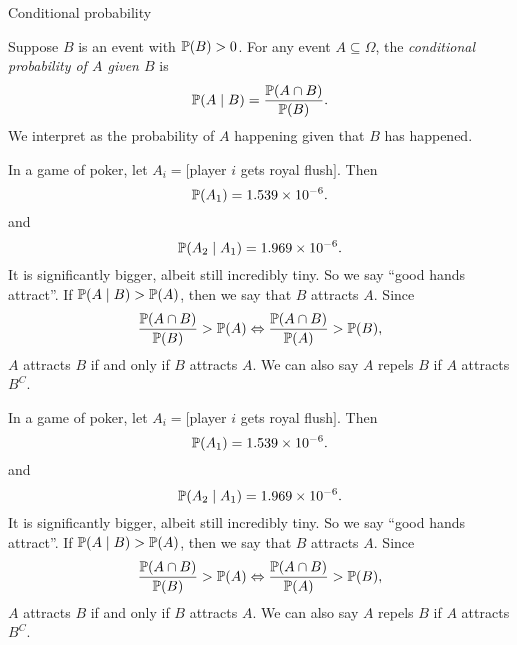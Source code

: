 %
\begin{note}
  \begin{field}
    Conditional probability
  \end{field}
  \begin{field}
    \begin{defi}
      Suppose $B$ is an event with $\P(B) > 0$. For any event $A\subseteq \Omega$, the \emph{conditional probability of $A$ given $B$} is
      \[
        \P(A\mid B) = \frac{\P(A\cap B)}{\P(B)}.
      \]
      We interpret as the probability of $A$ happening given that $B$ has happened.
    \end{defi}
  \end{field}
  \xplain{}%
\end{note}

\begin{note}
  \begin{field}
    \begin{eg}
      In a game of poker, let $A_i = [$player $i$ gets royal flush$]$. Then
      \[
        \P(A_1) = 1.539\times 10^{-6}.
      \]
      and
      \[
        \P(A_2\mid A_1) = 1.969\times 10^{-6}.
      \]
      It is significantly bigger, albeit still incredibly tiny. So we say ``good hands attract''.
      If $\P(A\mid B) > \P(A)$, then we say that $B$ attracts $A$. Since
      \[
        \frac{\P(A\cap B)}{\P(B)} > \P(A) \Leftrightarrow \frac{\P(A\cap B)}{\P(A)} > \P(B),
      \]
      $A$ attracts $B$ if and only if $B$ attracts $A$. We can also say $A$ repels $B$ if $A$ attracts $B^C$.
    \end{eg}
  \end{field}
  \begin{field}
    \begin{eg}
      In a game of poker, let $A_i = [$player $i$ gets royal flush$]$. Then
      \[
        \P(A_1) = 1.539\times 10^{-6}.
      \]
      and
      \[
        \P(A_2\mid A_1) = 1.969\times 10^{-6}.
      \]
      It is significantly bigger, albeit still incredibly tiny. So we say ``good hands attract''.
      If $\P(A\mid B) > \P(A)$, then we say that $B$ attracts $A$. Since
      \[
        \frac{\P(A\cap B)}{\P(B)} > \P(A) \Leftrightarrow \frac{\P(A\cap B)}{\P(A)} > \P(B),
      \]
      $A$ attracts $B$ if and only if $B$ attracts $A$. We can also say $A$ repels $B$ if $A$ attracts $B^C$.
    \end{eg}
  \end{field}
  \xplain{}%
\end{note}

